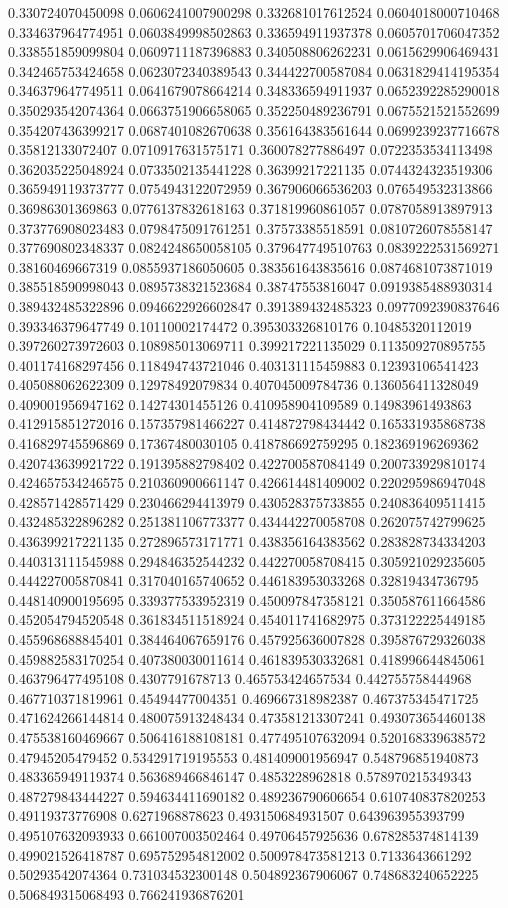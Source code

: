 \begin{table}
\begin{tabu}
\begin{sparkline}{10}
0.330724070450098 0.0606241007900298 0.332681017612524 0.0604018000710468 0.334637964774951 0.0603849998502863 0.336594911937378 0.0605701706047352 0.338551859099804 0.0609711187396883 0.340508806262231 0.0615629906469431 0.342465753424658 0.0623072340389543 0.344422700587084 0.0631829414195354 0.346379647749511 0.0641679078664214 0.348336594911937 0.0652392285290018 0.350293542074364 0.0663751906658065 0.352250489236791 0.0675521521552699 0.354207436399217 0.0687401082670638 0.356164383561644 0.0699239237716678 0.35812133072407 0.0710917631575171 0.360078277886497 0.0722353534113498 0.362035225048924 0.0733502135441228 0.36399217221135 0.0744324323519306 0.365949119373777 0.0754943122072959 0.367906066536203 0.076549532313866 0.36986301369863 0.0776137832618163 0.371819960861057 0.0787058913897913 0.373776908023483 0.0798475091761251 0.37573385518591 0.0810726078558147 0.377690802348337 0.0824248650058105 0.379647749510763 0.0839222531569271 0.38160469667319 0.0855937186050605 0.383561643835616 0.0874681073871019 0.385518590998043 0.0895738321523684 0.38747553816047 0.0919385488930314 0.389432485322896 0.0946622926602847 0.391389432485323 0.0977092390837646 0.393346379647749 0.10110002174472 0.395303326810176 0.10485320112019 0.397260273972603 0.108985013069711 0.399217221135029 0.113509270895755 0.401174168297456 0.118494743721046 0.403131115459883 0.12393106541423 0.405088062622309 0.12978492079834 0.407045009784736 0.136056411328049 0.409001956947162 0.14274301455126 0.410958904109589 0.14983961493863 0.412915851272016 0.157357981466227 0.414872798434442 0.165331935868738 0.416829745596869 0.17367480030105 0.418786692759295 0.182369196269362 0.420743639921722 0.191395882798402 0.422700587084149 0.200733929810174 0.424657534246575 0.210360900661147 0.426614481409002 0.220295986947048 0.428571428571429 0.230466294413979 0.430528375733855 0.240836409511415 0.432485322896282 0.251381106773377 0.434442270058708 0.262075742799625 0.436399217221135 0.272896573171771 0.438356164383562 0.283828734334203 0.440313111545988 0.294846352544232 0.442270058708415 0.305921029235605 0.444227005870841 0.317040165740652 0.446183953033268 0.32819434736795 0.448140900195695 0.339377533952319 0.450097847358121 0.350587611664586 0.452054794520548 0.361834511518924 0.454011741682975 0.373122225449185 0.455968688845401 0.384464067659176 0.457925636007828 0.395876729326038 0.459882583170254 0.407380030011614 0.461839530332681 0.418996644845061 0.463796477495108 0.4307791678713 0.465753424657534 0.442755758444968 0.467710371819961 0.45494477004351 0.469667318982387 0.467375345471725 0.471624266144814 0.480075913248434 0.473581213307241 0.493073654460138 0.475538160469667 0.506416188108181 0.477495107632094 0.520168339638572 0.47945205479452 0.534291719195553 0.481409001956947 0.548796851940873 0.483365949119374 0.563689466846147 0.4853228962818 0.578970215349343 0.487279843444227 0.594634411690182 0.489236790606654 0.610740837820253 0.49119373776908 0.6271968878623 0.493150684931507 0.643963955393799 0.495107632093933 0.661007003502464 0.49706457925636 0.678285374814139 0.499021526418787 0.695752954812002 0.500978473581213 0.7133643661292 0.50293542074364 0.731034532300148 0.504892367906067 0.748683240652225 0.506849315068493 0.766241936876201 
\end{sparkline}
\end{tabu}
\end{table}
